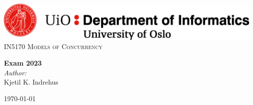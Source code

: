 \begin{titlepage}
    \vbox{ }
    \vbox{ }
    \begin{center}
        \includegraphics[width=1\textwidth]{./images/ifi.png}\\[1cm]
        \textsc{\Large IN5170 Models of Concurrency}\\[0.5cm]
        \vbox{ }
        
        { \huge \bfseries Exam 2023}\\[0.4cm]
        
        \large
        \emph{Author:}\\
            Kjetil K. Indrehus
        \vfill
        
        {\large\today}
    \end{center}
\end{titlepage}